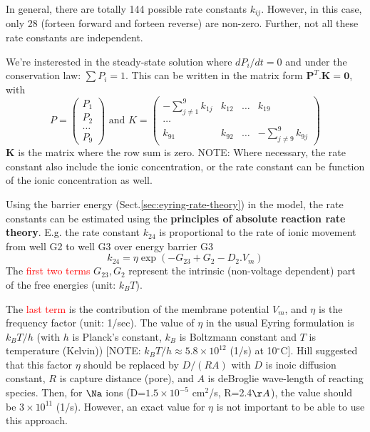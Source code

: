 In general, there are totally 144 possible rate constants $k_{ij}$. However, in
this case, only 28 (forteen forward and forteen reverse) are non-zero. Further,
not all these rate constants are independent.

We're insterested in the steady-state solution where $dP_i/dt = 0$ and under the
conservation law: $\sum P_i = 1$. This can be written in the matrix form
$\mathbf{P}^T.\mathbf{K = 0}$, with
\begin{equation}
P = \left(\begin{array}{c} P_1 \\ P_2 \\ \ldots \\ P_9
\end{array}
 \right) \text{ and } K = \left( \begin{array}{cccc} 
 -\sum^9_{j\ne 1}k_{1j} &  k_{12} & \ldots & k_{19} \\
 \ldots \\
 k_{91} & k_{92} & \ldots & -\sum^9_{j\ne 9}k_{9j}
 \end{array}\right)
\end{equation}
$\mathbf{K}$ is the matrix where the row sum is zero. NOTE: Where necessary, the
rate constant also include the ionic concentration, or the rate constant can be
function of the ionic concentration as well.

\begin{mdframed}

Using the barrier energy (Sect.\ref{sec:eyring-rate-theory}) in the model, the
rate constants can be estimated using the {\bf principles of absolute reaction
rate theory}. E.g. the rate constant $k_{24}$ is proportional to the rate of
ionic movement from well G2 to well G3 over energy barrier G3
\begin{equation}
k_{24} = \eta \exp\left( -G_{23} + G_2 - D_2.V_m \right)
\end{equation}
The \textcolor{red}{first two terms} $G_{23}, G_2$ represent the intrinsic
(non-voltage dependent) part of the free energies (unit: $k_BT$). 

The \textcolor{red}{last term} is the contribution of the membrane potential
$V_m$, and $\eta$ is the frequency factor (unit: 1/sec). The value of $\eta$ in the usual Eyring
formulation is $k_BT/h$ (with $h$ is Planck's constant, $k_B$ is Boltzmann
constant and $T$ is temperature (Kelvin)) [NOTE: $k_BT/h \approx 5.8\times
10^{12}$ (1/s) at 10$^\circ$C]. Hill suggested that this factor $\eta$ should be
replaced by $D/(RA)$ with $D$ is inoic diffusion constant, $R$ is capture
distance (pore), and $A$ is deBroglie wave-length of reacting species. Then, for
$\Na$ ions (D=$1.5\times10^{-5}$ cm$^2$/s, R=2.4$\AA$), the value should be $3\times
10^{11}$ (1/s). However, an exact value for $\eta $ is not important to be able
to use this approach.
\end{mdframed}

